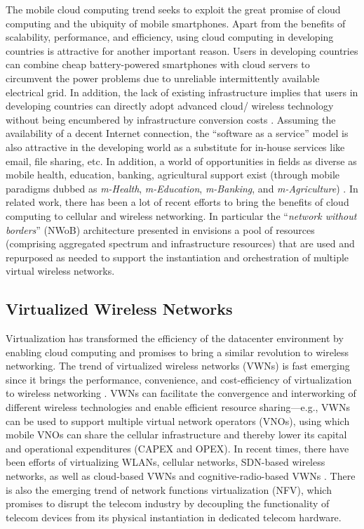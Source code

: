 \documentclass{sigcomm-alternate}
\begin{document}
The mobile cloud computing trend seeks to exploit the great promise of cloud computing and the ubiquity of mobile smartphones. Apart from the benefits of scalability, performance, and efficiency, using cloud computing in developing countries is attractive for another important reason. Users in developing countries can combine cheap battery-powered smartphones with cloud servers to circumvent the power problems due to unreliable intermittently available electrical grid. In addition, the lack of existing infrastructure implies that users in developing countries can directly adopt advanced cloud/ wireless technology without being encumbered by infrastructure conversion costs \cite{greengard2010cloud}. Assuming the availability of a decent Internet connection, the ``software as a service'' model is also attractive in the developing world as a substitute for in-house services like email, file sharing, etc. In addition, a world of opportunities in fields as diverse as mobile health,  education, banking, agricultural support exist (through mobile paradigms dubbed as \textit{m-Health}, \textit{m-Education}, \textit{m-Banking}, and \textit{m-Agriculture}) \cite{greengard2010cloud}. In related work, there has been a lot of recent efforts to bring the benefits of cloud computing to cellular and wireless networking. In particular the ``\textit{network without borders}'' (NWoB) architecture presented in  \cite{doyle2014spectrum} envisions a pool of resources (comprising aggregated spectrum and infrastructure resources) that are used and repurposed as needed to support the instantiation and orchestration of multiple virtual wireless networks. 









\subsection{Virtualized Wireless Networks}

Virtualization has transformed the efficiency of the datacenter environment by enabling cloud computing and promises to bring a similar revolution to wireless networking. The trend of virtualized wireless networks (VWNs) is fast emerging since it brings the performance, convenience, and cost-efficiency of virtualization to wireless networking \cite{qadir2014building}. VWNs can facilitate the convergence and interworking of different wireless technologies and enable efficient resource sharing---e.g., VWNs can be used to support multiple virtual network operators (VNOs), using which mobile VNOs can share the cellular infrastructure and thereby lower its capital and operational expenditures (CAPEX and OPEX). In recent times, there have been efforts of virtualizing WLANs, cellular networks, SDN-based wireless networks, as well as cloud-based VWNs and cognitive-radio-based VWNs \cite{qadir2014building}. There is also the emerging trend of network functions virtualization (NFV), which  promises to disrupt the telecom industry by decoupling the functionality of telecom devices from its physical instantiation in dedicated telecom hardware. 
\end{document}
